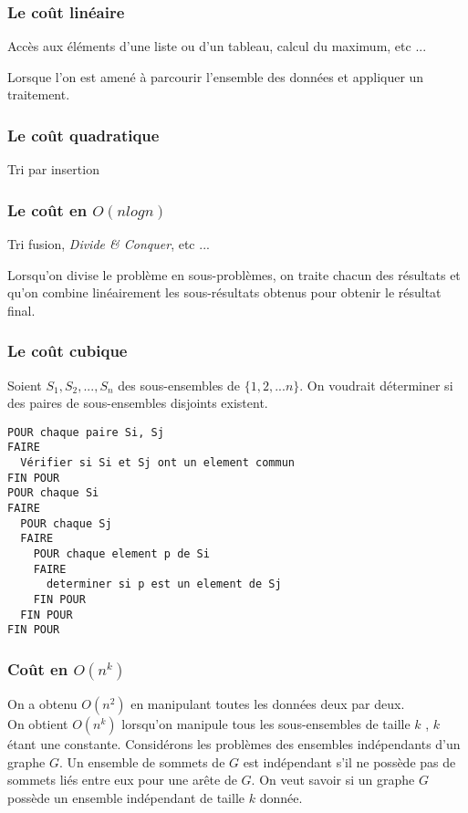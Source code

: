 \subsubsection{Le coût linéaire}
Accès aux éléments d'une liste ou d'un tableau, calcul du maximum, etc ...

Lorsque l'on est amené à parcourir l'ensemble des données et appliquer un
traitement.


\subsubsection{Le coût quadratique}

Tri par insertion

\subsubsection{Le coût en $O(nlogn)$}
Tri fusion, \textit{Divide \& Conquer}, etc ...

Lorsqu'on divise le problème en sous-problèmes, on traite chacun des
résultats et qu'on combine linéairement les sous-résultats obtenus pour
obtenir le résultat final.

\subsubsection{Le coût cubique}

Soient $S_1, S_2, ..., S_n$ des sous-ensembles de $\{1,2,...n\}$. On
voudrait déterminer si des paires de sous-ensembles disjoints existent.
\begin{verbatim}
POUR chaque paire Si, Sj
FAIRE
  Vérifier si Si et Sj ont un element commun
FIN POUR
POUR chaque Si
FAIRE
  POUR chaque Sj
  FAIRE
    POUR chaque element p de Si
    FAIRE
      determiner si p est un element de Sj
    FIN POUR
  FIN POUR
FIN POUR
\end{verbatim}

\subsubsection{Coût en $O(n^k)$}
On a obtenu $O(n^2)$ en manipulant toutes les données deux par deux.\\

On obtient $O(n^k)$ lorsqu'on manipule tous les sous-ensembles de taille $k$
, $k$ étant une constante. Considérons les problèmes des ensembles
indépendants d'un graphe $G$. Un ensemble de sommets de $G$ est indépendant
s'il ne possède pas de sommets liés entre eux pour une arête de $G$. On veut
savoir si un graphe $G$ possède un ensemble indépendant de taille $k$ donnée.

